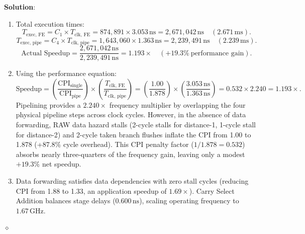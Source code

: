 \begin{problem}
\textbf{Solution}:
\begin{enumerate}
    \item Total execution times:
    \begin{equation}
    T_{\text{exec, FE}} = C_1 \times T_{\text{clk, FE}} = 874,891 \times 3.053\,\text{ns} = 2,671,042\,\text{ns} \quad (2.671\,\text{ms}).
    \end{equation}
    \begin{equation}
    T_{\text{exec, pipe}} = C_4 \times T_{\text{clk, pipe}} = 1,643,060 \times 1.363\,\text{ns} = 2,239,491\,\text{ns} \quad (2.239\,\text{ms}).
    \end{equation}
    \begin{equation}
    \text{Actual Speedup} = \frac{2,671,042\,\text{ns}}{2,239,491\,\text{ns}} = \mathbf{1.193\times} \quad (+19.3\% \ \text{performance gain}).
    \end{equation}
    \item Using the performance equation:
    \begin{equation}
    \text{Speedup} = \left(\frac{\text{CPI}_{\text{single}}}{\text{CPI}_{\text{pipe}}}\right) \times \left(\frac{T_{\text{clk, FE}}}{T_{\text{clk, pipe}}}\right) = \left(\frac{1.00}{1.878}\right) \times \left(\frac{3.053\,\text{ns}}{1.363\,\text{ns}}\right) = 0.532 \times 2.240 = \mathbf{1.193\times}.
    \end{equation}
    Pipelining provides a $2.240\times$ frequency multiplier by overlapping the four physical pipeline steps across clock cycles. However, in the absence of data forwarding, RAW data hazard stalls (2-cycle stalls for distance-1, 1-cycle stall for distance-2) and 2-cycle taken branch flushes inflate the CPI from 1.00 to 1.878 (+87.8\% cycle overhead). This CPI penalty factor ($1 / 1.878 = 0.532$) absorbs nearly three-quarters of the frequency gain, leaving only a modest $+19.3\%$ net speedup.
    \item Data forwarding satisfies data dependencies with zero stall cycles (reducing CPI from 1.88 to 1.33, an application speedup of $1.69\times$). Carry Select Addition balances stage delays ($0.600\,\text{ns}$), scaling operating frequency to $1.67\,\text{GHz}$.
\end{enumerate}
$\diamond$
\end{problem}

